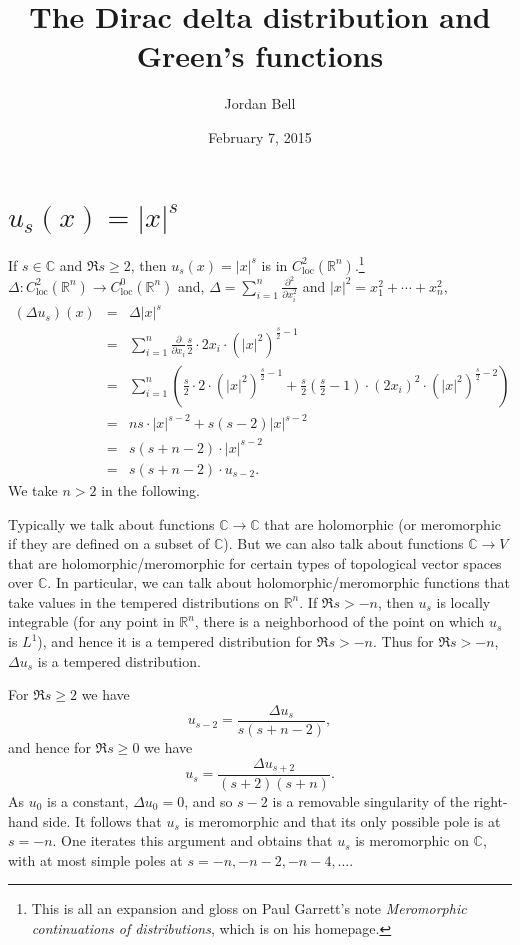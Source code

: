 \documentclass{article}
\begin{document}
\title{The Dirac delta distribution and Green's functions}
\author{Jordan Bell}
\date{February 7, 2015}

\maketitle

\section{$u_s(x)=|x|^s$}
If $s \in \mathbb{C}$ and $\Re s \geq 2$, then $u_s(x)=|x|^s$ is in $C^2_{\textrm{loc}}(\mathbb{R}^n)$.\footnote{This is all an expansion and gloss on Paul Garrett's note {\em Meromorphic continuations of distributions}, which is on his homepage. }  $\Delta:C^2_{\textrm{loc}}(\mathbb{R}^n) \to 
C^0_{\textrm{loc}}(\mathbb{R}^n)$ and, $\Delta=\sum_{i=1}^n \frac{\partial^2}{\partial x_i^2}$
and $|x|^2=x_1^2+\cdots+x_n^2$,
\begin{eqnarray*}
(\Delta u_s)(x) &=& \Delta |x|^s\\
&=& \sum_{i=1}^n \frac{\partial}{\partial x_i} \frac{s}{2} \cdot 2x_i \cdot (|x|^2)^{\frac{s}{2}-1}\\
&=&\sum_{i=1}^n \left( \frac{s}{2}\cdot 2\cdot(|x|^2)^{\frac{s}{2}-1}+ \frac{s}{2}\left(\frac{s}{2}-1\right)\cdot (2x_i)^2 \cdot(|x|^2)^{\frac{s}{2}-2}\right)\\
&=&ns\cdot |x|^{s-2}+s(s-2)|x|^{s-2}\\
&=& s(s+n-2) \cdot |x|^{s-2}\\
&=&s(s+n-2)\cdot u_{s-2}.
\end{eqnarray*}
We take $n >2$ in the following. 

Typically we talk about functions $\mathbb{C} \to \mathbb{C}$ that are holomorphic (or meromorphic if they are defined on a subset of $\mathbb{C}$). 
But we can also talk about functions $\mathbb{C} \to V$ that are holomorphic/meromorphic for certain types of topological vector spaces over $\mathbb{C}$. 
In particular, we can talk about holomorphic/meromorphic functions that take values in the tempered distributions on $\mathbb{R}^n$. 
If $\Re s>-n$, then $u_s$ is locally integrable (for any point in $\mathbb{R}^n$, there is a neighborhood of the point on which $u_s$ is $L^1$), and hence
it is a tempered distribution for $\Re s > -n$.
Thus for $\Re s >-n$, $\Delta u_s$ is a tempered distribution. 

For $\Re s \geq 2$ we have 
\[
u_{s-2} = \frac{\Delta u_s}{s(s+n-2)},
\]
and hence for $\Re s \geq 0$ we have
\[
u_s = \frac{\Delta u_{s+2}}{(s+2)(s+n)}.
\]
As $u_0$ is a constant, $\Delta u_0=0$, and so $s-2$ is a removable singularity of the right-hand side. It follows that $u_s$ is meromorphic and that its only
possible pole is at $s=-n$. One iterates this argument and obtains that $u_s$ is meromorphic on $\mathbb{C}$, with at most simple poles at $s=-n,-n-2,-n-4,\ldots$. 
 
\end{document}
